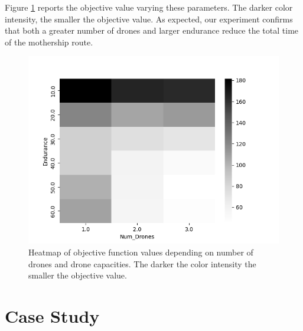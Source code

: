 \documentclass[10pt,a4paper]{elsarticle}
\begin{document}
\noindent
Figure \ref{fig:heatmap} reports the objective value varying these parameters. The darker color intensity, the smaller the objective value. As expected, our experiment confirms that both a greater number of drones and larger endurance reduce the total time of the mothership route.


\begin{figure}[h!]
\includegraphics[width=\linewidth]{heatmap_gray.png}
\caption{Heatmap of objective function values depending on number of drones and drone capacities. The darker the color intensity the smaller the objective value. \label{fig:heatmap}}
\end{figure}
\noindent


\section{Case Study\label{section:CS}}
\end{document}
